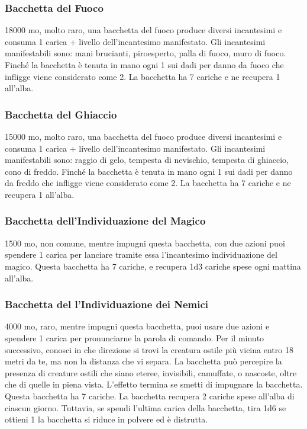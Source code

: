 \begin{multicols}{2}
\subsubsection*{Bacchetta del Fuoco}
18000 mo, molto raro, una bacchetta del fuoco produce diversi incantesimi e consuma 1 carica + livello dell'incantesimo manifestato. Gli incantesimi manifestabili sono: mani brucianti, piroesperto, palla di fuoco, muro di fuoco. Finché la bacchetta è tenuta in mano ogni 1 sui dadi per danno da fuoco che infligge viene considerato come 2. La bacchetta ha 7 cariche e ne recupera 1 all'alba.

\subsubsection*{Bacchetta del Ghiaccio}
15000 mo, molto raro, una bacchetta del fuoco produce diversi incantesimi e consuma 1 carica + livello dell'incantesimo manifestato. Gli incantesimi manifestabili sono: raggio di gelo, tempesta di nevischio, tempesta di ghiaccio, cono di freddo. Finché la bacchetta è tenuta in mano ogni 1 sui dadi per danno da freddo che infligge viene considerato come 2. La bacchetta ha 7 cariche e ne recupera 1 all'alba.

\subsubsection*{Bacchetta dell'Individuazione del Magico}
1500 mo, non comune, mentre impugni questa bacchetta, con due azioni puoi spendere 1 carica per lanciare tramite essa l'incantesimo individuazione del magico. Questa bacchetta ha 7 cariche, e recupera 1d3 cariche spese ogni mattina all'alba.

\subsubsection*{Bacchetta del l'Individuazione dei Nemici}
4000 mo, raro, mentre impugni questa bacchetta, puoi usare due azioni e spendere 1 carica per pronunciarne la parola di comando. Per il minuto successivo, conosci in che direzione si trovi la creatura ostile più vicina entro 18 metri da te, ma non la distanza che vi separa. La bacchetta può percepire la presenza di creature ostili che siano eteree, invisibili, camuffate, o nascoste, oltre che di quelle in piena vista. L'effetto termina se smetti di impugnare la bacchetta. Questa bacchetta ha 7 cariche. La bacchetta recupera 2 cariche spese all'alba di ciascun giorno. Tuttavia, se spendi l'ultima carica della bacchetta, tira 1d6 se ottieni 1 la bacchetta si riduce in polvere ed è distrutta.


\end{multicols}
